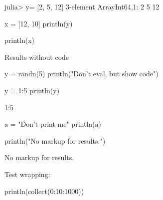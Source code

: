 
\begin{juliaterm}
julia> y= [2, 5, 12]
3-element Array{Int64,1}:
  2
  5
 12
\end{juliaterm}



\begin{juliacode}
x = [12, 10]
println(y)

\end{juliacode}
\begin{juliaout}
[2,5,12]
\end{juliaout}

\begin{juliacode}
println(x)
\end{juliacode}
\begin{juliaout}
[12,10]
\end{juliaout}




\begin{juliaout}
Results without code
\end{juliaout}

\begin{juliaout}
[12,10]
\end{juliaout}




\begin{juliacode}
y = randn(5)
println("Don't eval, but show code")
\end{juliacode}



\begin{juliacode}
y = 1:5
println(y)
\end{juliacode}
\begin{juliaout}
1:5
\end{juliaout}



\begin{juliacode}
a = "Don't print me"
println(a)
\end{juliacode}



\begin{juliacode}
println("No markup for results.")
\end{juliacode}
No markup for results.




Test wrapping:

\begin{juliacode}
println(collect(0:10:1000))
\end{juliacode}
\begin{juliaout}
[0,10,20,30,40,50,60,70,80,90,100,110,120,130,140,150,160,170,180,190,200,2
10,220,230,240,250,260,270,280,290,300,310,320,330,340,350,360,370,380,390,
400,410,420,430,440,450,460,470,480,490,500,510,520,530,540,550,560,570,580
,590,600,610,620,630,640,650,660,670,680,690,700,710,720,730,740,750,760,77
0,780,790,800,810,820,830,840,850,860,870,880,890,900,910,920,930,940,950,9
60,970,980,990,1000]
\end{juliaout}



